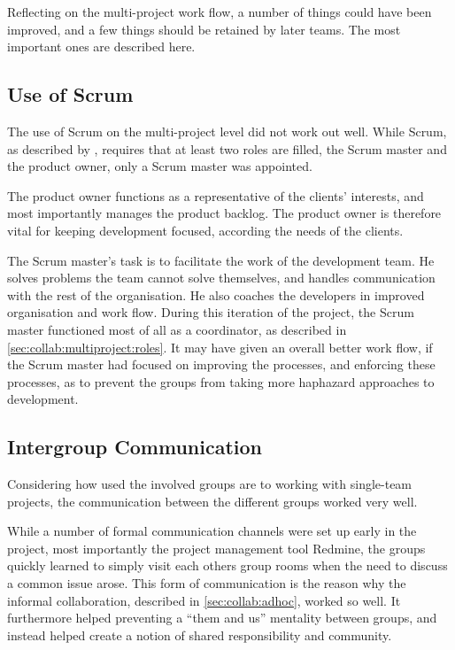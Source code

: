 Reflecting on the multi-project work flow, a number of things could have been improved, and a few things should be retained by later teams. 
The most important ones are described here.

\subsection{Use of Scrum}
\label{sec:eval:multiproject:scrum}
The use of Scrum on the multi-project level did not work out well. 
While Scrum, as described by \citet{scrumGuide}, requires that at least two roles are filled, the Scrum master and the product owner, only a Scrum master was appointed. 

The product owner functions as a representative of the clients' interests, and most importantly manages the product backlog. 
The product owner is therefore vital for keeping development focused, according the needs of the clients.

The Scrum master's task is to facilitate the work of the development team. 
He solves problems the team cannot solve themselves, and handles communication with the rest of the organisation. 
He also coaches the developers in improved organisation and work flow. 
During this iteration of the \giraf project, the Scrum master functioned most of all as a coordinator, as described in \cref{sec:collab:multiproject:roles}. 
It may have given an overall better work flow, if the Scrum master had focused on improving the processes, and enforcing these processes, as to prevent the groups from taking more haphazard approaches to development.

\subsection{Intergroup Communication}
Considering how used the involved groups are to working with single-team projects, the communication between the different groups worked very well. 

While a number of formal communication channels were set up early in the project, most importantly the project management tool Redmine, the groups quickly learned to simply visit each others group rooms when the need to discuss a common issue arose.
This form of communication is the reason why the informal collaboration, described in \cref{sec:collab:adhoc}, worked so well.
It furthermore helped preventing a ``them and us'' mentality between groups, and instead helped create a notion of shared responsibility and community. 